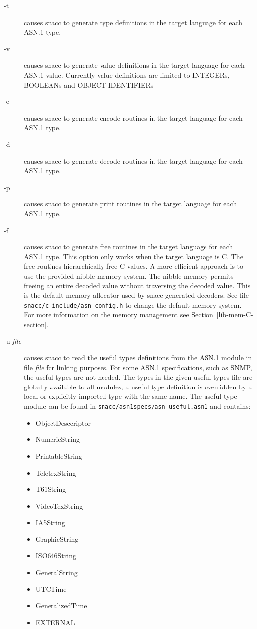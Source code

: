 \begin{description}
\item[-t    ] {causes snacc to generate type definitions in the
target language for each ASN.1 type.}

\item[-v    ] {causes snacc to generate value definitions in the
target language for each ASN.1 value.  Currently value definitions are
limited to INTEGERs, BOOLEANs and OBJECT IDENTIFIERs.}

\item[-e    ] {causes snacc to generate encode routines in the
target language for each ASN.1 type.}

\item[-d    ] {causes snacc to generate decode routines in the
target language for each ASN.1 type.}

\item[-p    ] {causes snacc to generate print routines in the
target language for each ASN.1 type.}

\item[-f    ] {causes snacc to generate free routines in the
target language for each ASN.1 type.  This option only works when the
target language is C\@.  The free routines hierarchically free C values.
A more efficient approach is to use the provided nibble-memory system.
The nibble memory permits freeing an entire decoded value without
traversing the decoded value.  This is the default memory allocator
used by snacc generated decoders.  See file
\verb$snacc/c_include/asn_config.h$ to change the default memory
system.  For more information on the memory management see Section~\ref{lib-mem-C-section}.}

\item[-u {\em file}] {causes snacc to read the useful types
definitions from the ASN.1 module in file {\em file}
for linking purposes.  For some ASN.1 specifications, such as SNMP,
the useful types are not needed.  The types in the given useful types
file are globally available to all modules; a useful type definition
is overridden by a local or explicitly imported type with the same
name. The useful type module can be found in
\verb$snacc/asn1specs/asn-useful.asn1$ and contains:


\begin{itemize}
\setlength{\itemsep}{0pt}
\setlength{\parsep}{0pt}
\item ObjectDesccriptor
\item NumericString
\item PrintableString
\item TeletexString
\item T61String
\item VideoTexString
\item IA5String
\item GraphicString
\item ISO646String
\item GeneralString
\item UTCTime
\item GeneralizedTime
\item EXTERNAL
\end{itemize}}



\end{description}
